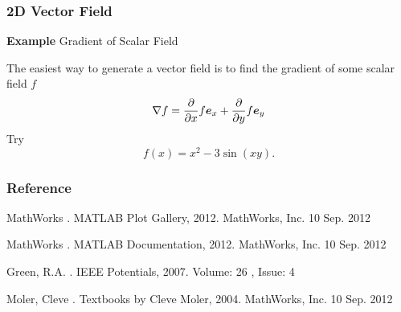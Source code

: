 \documentclass{beamer}  %
\begin{document}
\begin{frame}[fragile]
\frametitle{2D Vector Field}
\textbf{Example} Gradient of Scalar Field

The easiest way to generate a vector field is to find the gradient of some scalar field $f$
\begin{equation}
    \nabla f = \frac{\partial}{\partial x} f \boldsymbol{e}_x + \frac{\partial}{\partial y} f \boldsymbol{e}_y 
\end{equation}
\pause
Try
\begin{equation}
    f(x) = x^2 - 3\sin(xy).
\end{equation}

\begin{figure}
    \centering
\end{figure}

\end{frame}
\begin{frame}[allowframebreaks]
\frametitle{Reference}
  \begin{thebibliography}{10}    
    MathWorks
    .
    \newblock MATLAB Plot Gallery, 2012. MathWorks, Inc. 10 Sep. 2012
  \end{thebibliography}

  \begin{thebibliography}{10}    
    MathWorks
    .
    \newblock MATLAB Documentation, 2012. MathWorks, Inc. 10 Sep. 2012
  \end{thebibliography}

  \begin{thebibliography}{10}    
    Green, R.A. 
    .
    \newblock IEEE Potentials, 2007. Volume: 26 , Issue: 4 
  \end{thebibliography}
  
  \begin{thebibliography}{10}    
    Moler, Cleve
    .
    \newblock Textbooks by Cleve Moler, 2004. MathWorks, Inc. 10 Sep. 2012
  \end{thebibliography}
  
\end{frame}
\end{document}
